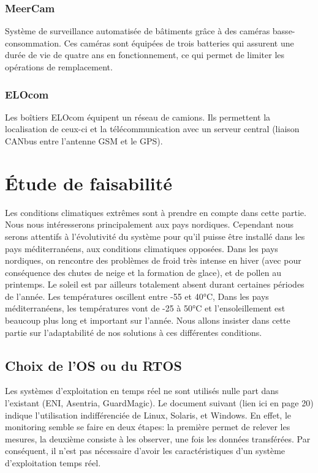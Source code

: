 \subsubsection{MeerCam}

Système de surveillance automatisée de bâtiments grâce à des caméras basse-consommation. Ces caméras sont équipées de trois batteries qui assurent une durée de vie de quatre ans en fonctionnement, ce qui permet de limiter les opérations de remplacement.

\subsubsection{ELOcom}

Les boîtiers ELOcom équipent un réseau de camions. Ils permettent la localisation de ceux-ci et la télécommunication avec un serveur central (liaison CANbus entre l’antenne GSM et le GPS).

\section{Étude de faisabilité}

Les conditions climatiques extrêmes sont à prendre en compte dans cette partie. Nous nous intéresserons principalement aux pays nordiques. Cependant nous serons attentifs à l’évolutivité du système pour qu’il puisse être installé dans les pays méditerranéens, aux conditions climatiques opposées.
Dans les pays nordiques, on rencontre des problèmes de froid très intense en hiver (avec pour conséquence des chutes de neige et la formation de glace), et de pollen au printemps. Le soleil est par ailleurs totalement absent durant certaines périodes de l’année. Les températures oscillent entre -55 et 40°C, 
Dans les pays méditerranéens, les températures vont de -25 à 50°C et l'ensoleillement est beaucoup plus long et important sur l'année.
Nous allons insister dans cette partie sur l'adaptabilité de nos solutions à ces différentes conditions.


\subsection{Choix de l’OS ou du RTOS}

Les systèmes d’exploitation en temps réel ne sont utilisés nulle part dans l’existant (ENI, Asentria, GuardMagic). Le document suivant (lien ici en page 20) indique l’utilisation indifférenciée de Linux, Solaris, et Windows.
En effet, le monitoring semble se faire en deux étapes: la première permet de relever les mesures, la deuxième consiste à les observer, une fois les données transférées. Par conséquent, il n’est pas nécessaire d’avoir les caractéristiques d’un système d’exploitation temps réel.

